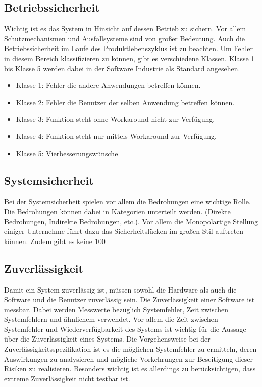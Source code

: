 \subsection{Betriebssicherheit}
Wichtig ist es das System in Hinsicht auf dessen Betrieb zu sichern. Vor allem Schutzmechanismen und Ausfallsysteme sind von großer Bedeutung. Auch die Betriebssicherheit im Laufe des Produktlebenszyklus ist zu beachten. Um Fehler in diesem Bereich klassifizieren zu können, gibt es verschiedene Klassen. Klasse 1 bis Klasse 5 werden dabei in der Software Industrie als Standard angesehen.

\begin{itemize}
\item Klasse 1: Fehler die andere Anwendungen betreffen können.
\item Klasse 2: Fehler die Benutzer der selben Anwendung betreffen können.
\item Klasse 3: Funktion steht ohne Workaround nicht zur Verfügung.
\item Klasse 4: Funktion steht nur mittels Workaround zur Verfügung.
\item Klasse 5: Vierbesserungswünsche 
\end{itemize}

\subsection{Systemsicherheit}
Bei der Systemsicherheit spielen vor allem die Bedrohungen eine wichtige Rolle. Die Bedrohungen können dabei in Kategorien unterteilt werden. (Direkte Bedrohungen, Indirekte Bedrohungen, etc.). Vor allem die Monopolartige Stellung einiger Unternehme führt dazu das Sicherheitslücken im großen Stil auftreten können. Zudem gibt es keine 100%

\subsection{Zuverlässigkeit}
Damit ein System zuverlässig ist, müssen sowohl die Hardware als auch die Software und die Benutzer zuverlässig sein. Die Zuverlässigkeit einer Software ist messbar. Dabei werden Messwerte bezüglich Systemfehler, Zeit zwischen Systemfehlern und ähnlichem verwendet. Vor allem die Zeit zwischen Systemfehler und Wiederverfügbarkeit des Systems ist wichtig für die Aussage über die Zuverlässigkeit eines Systems.
\linebreak
Die Vorgehensweise bei der Zuverlässigkeitsspezifikation  ist es die möglichen Systemfehler zu ermitteln, deren Auswirkungen zu analysieren und mögliche Vorkehrungen zur Beseitigung dieser Risiken zu realisieren. Besonders wichtig ist es allerdings zu berücksichtigen, dass extreme Zuverlässigkeit nicht testbar ist.

